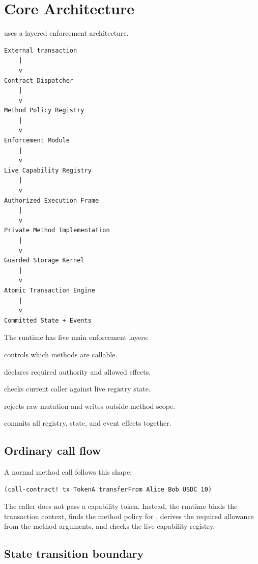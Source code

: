 \section{Core Architecture}

\SCS{} uses a layered enforcement architecture.

\begin{lstlisting}
External transaction
    |
    v
Contract Dispatcher
    |
    v
Method Policy Registry
    |
    v
Enforcement Module
    |
    v
Live Capability Registry
    |
    v
Authorized Execution Frame
    |
    v
Private Method Implementation
    |
    v
Guarded Storage Kernel
    |
    v
Atomic Transaction Engine
    |
    v
Committed State + Events
\end{lstlisting}

The runtime has five main enforcement layers:

\begin{description}[leftmargin=2.8cm]
  \item[Dispatcher] controls which methods are callable.
  \item[Method policy registry] declares required authority and allowed effects.
  \item[Enforcement module] checks current caller against live registry state.
  \item[Guarded storage kernel] rejects raw mutation and writes outside method scope.
  \item[Atomic transaction engine] commits all registry, state, and event effects together.
\end{description}

\subsection{Ordinary call flow}

A normal method call follows this shape:

\begin{lstlisting}
(call-contract! tx TokenA transferFrom Alice Bob USDC 10)
\end{lstlisting}

The caller does not pass a capability token. Instead, the runtime binds the transaction context, finds the method policy for , derives the required allowance from the method arguments, and checks the live capability registry.

\subsection{State transition boundary}


